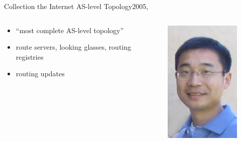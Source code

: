 \documentclass[ngerman,compress,hyperref={bookmarks}]{beamer}
\begin{document}
\begin{frame}{Collection the Internet AS-level Topology}{2005, \cite{Zhang:2005:CIA:1052812.1052825}}
  \begin{columns}[c]
    \begin{column}{0.5\textwidth}
      \begin{itemize}
        \item ``most complete AS-level topology''
        \item route servers, looking glasses, routing registries
        \item routing updates
      \end{itemize}
    \end{column}
    \begin{column}{0.08\textwidth}
      \begin{figure}
        \label{zhang_et_al}
        \includegraphics[width=1\textwidth]{images/zhang_b}\\

\end{figure}
\end{column}
\end{columns}
\end{frame}
\end{document}
